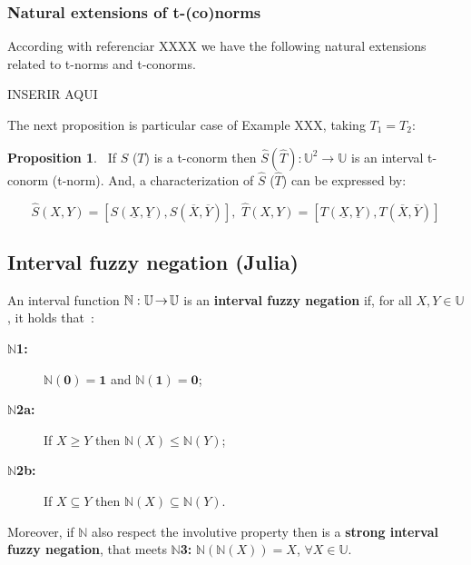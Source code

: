 \documentclass[conference]{IEEEtran}
\theoremstyle{plain}
\theoremstyle{remark}
\theoremstyle{definition}
\theoremstyle{proposition}
\newtheorem{proposition}[theorem]{Proposition}
\newcommand{\lra}{\hspace{-0.05cm}\rightarrow\hspace{-0.05cm}}
\newcommand{\UU}{\mathbb{U} }
\begin{document}
\subsubsection{Natural extensions of t-(co)norms}


According with referenciar XXXX we have the following natural extensions related to t-norms and t-conorms.

INSERIR AQUI


The next proposition is particular case of Example  XXX, taking $T_1=T_2$:

\begin{proposition}~\cite[Theorem 5.1]{BT06b}\label{pro-it-norm}
If  $S$ ($T$) is a t-conorm  then $\widehat{S} (\widehat{T}):\UU^2 \rightarrow \UU$ is an interval t-conorm (t-norm).
And, a characterization of $\widehat{S}$ ($\widehat{T}$) can be expressed by:

\begin{equation}\label{eq-int-s}
\widehat{S}(X,Y)=[S(\underline{X},\underline{Y}),
S(\overline{X},\overline{Y})],
\,\, \widehat{T}(X,Y)=[T(\underline{X},\underline{Y}),
T(\overline{X},\overline{Y})]
\end{equation}
\end{proposition}


\subsection{Interval fuzzy negation (Julia)}\label{subsec-4c} 
An interval function  $\mathbb{N}:\mathbb{U} \lra  \mathbb{U}$ is an \textbf{interval fuzzy negation} if, for all $X,Y \in\mathbb{U}$, it holds that~\cite[Def.~4.1]{BT06b}:
\begin{description}
\item[ \textbf{$\mathbb{N}$1:}] $\mathbb{N}(\mathbf{0}) = \mathbf{1}$ and $\mathbb{N}(\mathbf{1}) = \mathbf{0}$; 

\item[ \textbf{$\mathbb{N}$2a:}] If $X \geq Y$ then $\mathbb{N}(X)\leq \mathbb{N}(Y)$; 

\item[ \textbf{$\mathbb{N}$2b:}] If $X\subseteq Y$ then $\mathbb{N}(X)\subseteq \mathbb{N}(Y)$.
\end{description}

Moreover, if $\mathbb{N}$ also respect  the involutive  property then is a \textbf{strong  interval  fuzzy  negation}, that meets
 \textbf{$\mathbb{N}$3:} $\mathbb{N}(\mathbb{N}(X)) = X$, $\forall X \in \mathbb{U}$.
\end{document}
